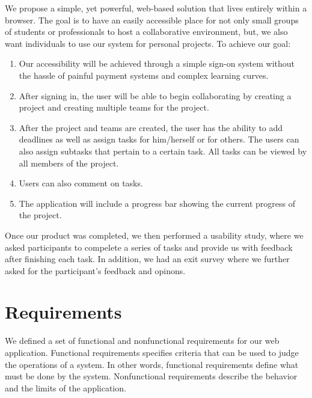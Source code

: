 We propose a simple, yet powerful, web-based solution that lives entirely within a browser. The goal is to have an easily accessible place for not only small groups of students or professionals to host a collaborative environment, but, we also want individuals to use our system for personal projects. To achieve our goal: 
\begin{enumerate}
	\item Our accessibility will be achieved through a simple sign-on system without the hassle of painful payment systems and complex learning curves. 
	\item After signing in, the user will be able to begin collaborating by creating a project and creating multiple teams for the project. 
	\item After the project and teams are created, the user has the ability to add deadlines as well as assign tasks for him/herself or for others. The users can also assign subtasks that pertain to a certain task. All tasks can be viewed by all members of the project.
	\item Users can also comment on tasks. 
	\item The application will include a progress bar showing the current progress of the project.
\end{enumerate}
Once our product was completed, we then performed a usability study, where we asked participants to compelete a series of tasks and provide us with feedback after finishing each task. In addition, we had an exit survey where we further asked for the participant's feedback and opinons.

\section{Requirements}
We defined a set of functional and nonfunctional requirements for our web application. Functional requirements specifies criteria that can be used to judge the operations of a system. In other words, functional requirements define what must be done by the system. Nonfunctional requirements describe the behavior and the limits of the application. 

